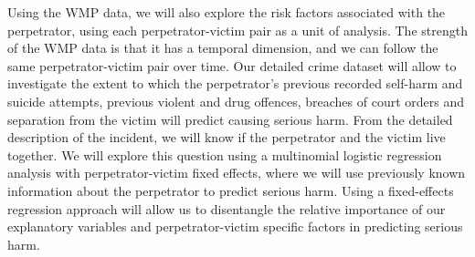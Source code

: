 \documentclass[11pt, a4paper]{article}
\begin{document}
Using the WMP data, we will also explore the risk factors associated with the perpetrator, using each perpetrator-victim pair as a unit of analysis. The strength of the WMP data is that it has a temporal dimension, and we can follow the same perpetrator-victim pair over time. Our detailed crime dataset will allow to investigate the extent to which the perpetrator's previous recorded self-harm and suicide attempts, previous violent and drug offences, breaches of court orders and separation from the victim will predict causing serious harm. From the detailed description of the incident, we will know if the perpetrator and the victim live together. We will explore this question using a multinomial logistic regression analysis with perpetrator-victim fixed effects, where we will use previously known information about the perpetrator to predict serious harm. Using a fixed-effects regression approach will allow us to disentangle the relative importance of our explanatory variables and perpetrator-victim specific factors in predicting serious harm.  

\end{document}
